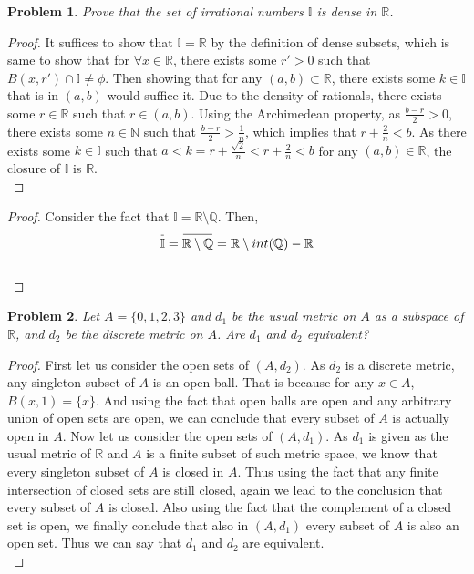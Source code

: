 \documentclass[paper=a4, fontsize=11pt]{scrartcl}
\newcommand{\overbar}[1]{
	\mkern 1.5mu \overline{\mkern-1.5mu\raisebox{0pt}[\dimexpr\height+0.5mm\relax]{$#1$}\mkern-1.5mu}\mkern 1.5mu
}
\newtheorem{problem}{Problem}
\begin{document}
\begin{problem}
	Prove that the set of irrational numbers $\mathbb{I}$ is dense in $\mathbb{R}$. \\
\end{problem}

\begin{proof}
	It suffices to show that $\bar{\mathbb{I}} = \mathbb{R}$ by the definition of dense subsets, which is same to show that for $\forall x \in \mathbb{R}$, there exists some $r'>0$ such that $B(x,r')\cap \mathbb{I} \neq \phi$. Then showing that for any $(a,b)\subset \mathbb{R}$, there exists some $k \in \mathbb{I}$ that is in $(a,b)$ would suffice it. Due to the density of rationals, there exists some $r \in \mathbb{R}$ such that $r \in (a,b)$. Using the Archimedean property, as $\frac{b-r}{2}>0$, there exists some $n \in \mathbb{N}$ such that $\frac{b-r}{2}> \frac{1}{n}$, which implies that $r+\frac{2}{n}<b$. As there exists some $k \in \mathbb{I}$ such that $a < k = r+\frac{\sqrt{2}}{n} < r+ \frac{2}{n} < b$ for any $(a,b) \in \mathbb{R}$, the closure of $\mathbb{I}$ is $\mathbb{R}$. \\
\end{proof}

\begin{proof}
	Consider the fact that $\mathbb{I} = \mathbb{R} \setminus \mathbb{Q}$. Then, \\
	
	\begin{equation}\nonumber
		\overbar{\mathbb{I} } = \overbar{\mathbb{R} \setminus \mathbb{Q} } =  \mathbb{R} \setminus int(\mathbb{Q}) - \mathbb{R}
	\end{equation}\\
\end{proof}

\begin{problem}
	Let $A=\{0,1,2,3\}$ and $d_1$ be the usual metric on $A$ as a subspace of $\mathbb{R}$, and $d_2$ be the discrete metric on $A$. Are $d_1$ and $d_2$ equivalent? \\
\end{problem}

\begin{proof}
	First let us consider the open sets of $(A,d_2)$. As $d_2$ is a discrete metric, any singleton subset of $A$ is an open ball. That is because for any $x \in A$, $B(x,1)=\{x\}$. And using the fact that open balls are open and any arbitrary union of open sets are open, we can conclude that every subset of $A$ is actually open in $A$. Now let us consider the open sets of $(A,d_1)$. As $d_1$ is given as the usual metric of $\mathbb{R}$ and $A$ is a finite subset of such metric space, we know that every singleton subset of $A$ is closed in $A$. Thus using the fact that any finite intersection of closed sets are still closed, again we lead to the conclusion that every subset of $A$ is closed. Also using the fact that the complement of a closed set is open, we finally conclude that also in $(A,d_1)$ every subset of $A$ is also an open set. Thus we can say that $d_1$ and $d_2$ are equivalent. \\
\end{proof}
\end{document}
